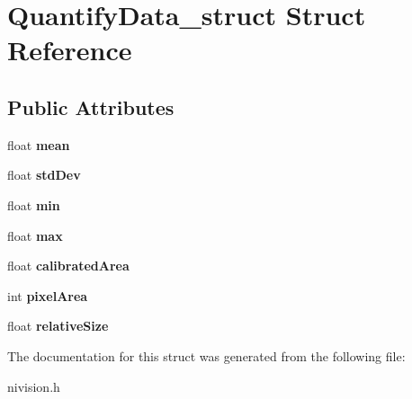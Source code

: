 \hypertarget{structQuantifyData__struct}{\section{\-Quantify\-Data\-\_\-struct \-Struct \-Reference}
\label{structQuantifyData__struct}
}
\subsection*{\-Public \-Attributes}
\begin{DoxyCompactItemize}
\item 
\hypertarget{structQuantifyData__struct_a29274fac0dbb5de9e48866f99a69db40}{float {\bfseries mean}}\label{structQuantifyData__struct_a29274fac0dbb5de9e48866f99a69db40}

\item 
\hypertarget{structQuantifyData__struct_a418a690d88842cd96a2612254190654e}{float {\bfseries std\-Dev}}\label{structQuantifyData__struct_a418a690d88842cd96a2612254190654e}

\item 
\hypertarget{structQuantifyData__struct_af2efe660342ef79f0e466c37aace3e4b}{float {\bfseries min}}\label{structQuantifyData__struct_af2efe660342ef79f0e466c37aace3e4b}

\item 
\hypertarget{structQuantifyData__struct_a33146e4db24e747dd3e11d89d0f07763}{float {\bfseries max}}\label{structQuantifyData__struct_a33146e4db24e747dd3e11d89d0f07763}

\item 
\hypertarget{structQuantifyData__struct_a1ea0aef06d3339d5270400733dda5491}{float {\bfseries calibrated\-Area}}\label{structQuantifyData__struct_a1ea0aef06d3339d5270400733dda5491}

\item 
\hypertarget{structQuantifyData__struct_a39404e7da14a1477e98653d773100268}{int {\bfseries pixel\-Area}}\label{structQuantifyData__struct_a39404e7da14a1477e98653d773100268}

\item 
\hypertarget{structQuantifyData__struct_a07dd2d718b0422b7c0113b4710bbc7a7}{float {\bfseries relative\-Size}}\label{structQuantifyData__struct_a07dd2d718b0422b7c0113b4710bbc7a7}

\end{DoxyCompactItemize}


\-The documentation for this struct was generated from the following file\-:\begin{DoxyCompactItemize}
\item 
nivision.\-h\end{DoxyCompactItemize}
